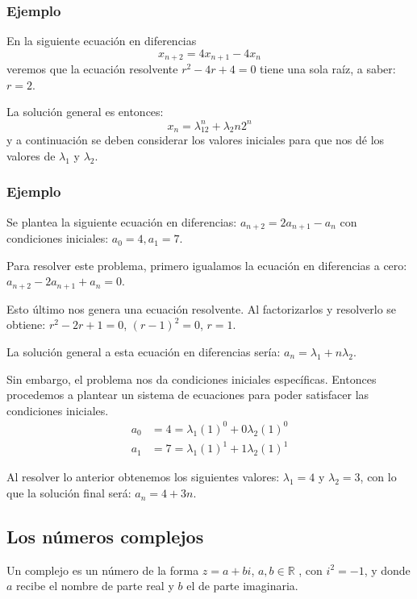 \documentclass{article}
\begin{document}
\subsubsection{Ejemplo}

En la siguiente ecuación en diferencias
\begin{equation}
  \label{eq:1}
  x_{n+2}=4x_{n+1}-4x_{n}
\end{equation}
veremos que la ecuación resolvente $r^2-4r+4=0$ tiene una sola raíz, a
saber: $r=2$.

La solución general es entonces:
$$x_n=\lambda_12^n+\lambda_2n2^n$$
y a continuación se deben considerar los valores iniciales para que
nos dé los valores de $\lambda_1$ y $\lambda_2$.

\subsubsection{Ejemplo}

Se plantea la siguiente ecuación en diferencias:
$a_{n+2}=2a_{n+1}-a_{n}$ con condiciones iniciales: $a_{0}=4, a_{1}=7$.

Para resolver este problema, primero igualamos la ecuación en diferencias a
cero: $a_{n+2}-2a_{n+1}+a_{n}=0$.

Esto último nos genera una ecuación resolvente. Al factorizarlos y
resolverlo se obtiene: $r^2-2r+1=0$, ${(r-1)^2=0}$, ${r=1}$.

La solución general a esta ecuación en diferencias sería:
$a_{n}=\lambda_{1}+n\lambda_{2}$.

Sin embargo, el problema nos da condiciones iniciales
específicas. Entonces procedemos a plantear un sistema de ecuaciones
para poder satisfacer las condiciones iniciales.
\begin{align*}
  a_{0}&=4=\lambda_{1}(1)^0+0\lambda_{2}(1)^0\\
  a_{1}&=7=\lambda_{1}(1)^1+1\lambda_{2}(1)^1
\end{align*}

Al resolver lo anterior obtenemos los siguientes valores:
$\lambda_{1}=4$ y $\lambda_{2}=3$, con lo que la solución final será:
$a_{n}=4+3n$.


\subsection{Los números  complejos}

Un complejo es un número de la forma $z=a+bi$, $a,b\in\mathbb{R}$ ,
con $i^2=-1$, y donde $a$ recibe el nombre de parte real y $b$ el de
parte imaginaria.
\end{document}
